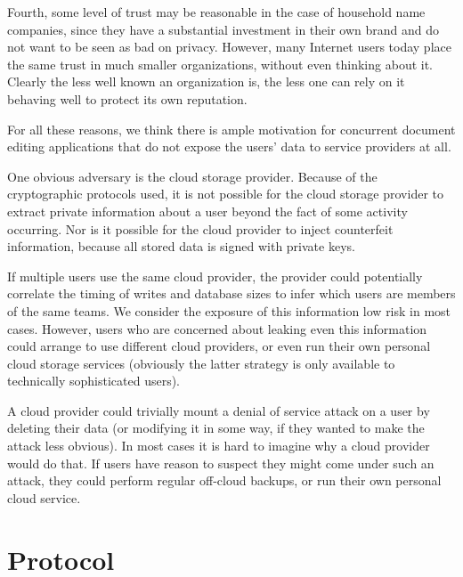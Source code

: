 \documentclass[pldi,10pt]{sigplanconf-pldi16}
\begin{document}
Fourth, some level of trust may be reasonable in the case of household name companies, since they have a substantial investment in their own brand and do not want to be seen as bad on privacy.
However, many Internet users today place the same trust in much smaller organizations, without even thinking about it.
Clearly the less well known an organization is, the less one can rely on it behaving well to protect its own reputation.

For all these reasons, we think there is ample motivation for concurrent document editing applications that do not expose the users' data to service providers at all.

One obvious adversary is the cloud storage provider.
Because of the cryptographic protocols used, it is not possible for the cloud storage provider to extract private information about a user beyond the fact of some activity occurring.
Nor is it possible for the cloud provider to inject counterfeit information, because all stored data is signed with private keys.

If multiple users use the same cloud provider, the provider could potentially correlate the timing of writes and database sizes to infer which users are members of the same teams.
We consider the exposure of this information low risk in most cases.
However, users who are concerned about leaking even this information could arrange to use different cloud providers, or even run their own personal cloud storage services (obviously the latter strategy is only available to technically sophisticated users).

A cloud provider could trivially mount a denial of service attack on a user by deleting their data (or modifying it in some way, if they wanted to make the attack less obvious).
In most cases it is hard to imagine why a cloud provider would do that.
If users have reason to suspect they might come under such an attack, they could perform regular off-cloud backups, or run their own personal cloud service.

\section{Protocol}
\end{document}

